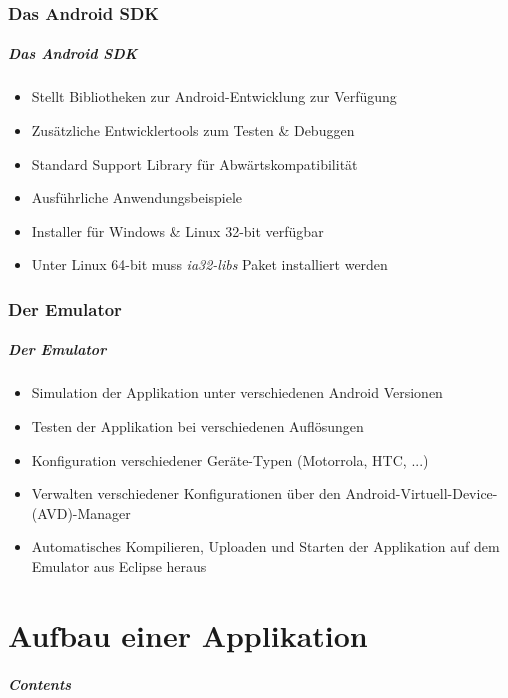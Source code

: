 \section{Das Android SDK}
\begin{frame}[label=eclipse_adt]
   \frametitle{Das Android SDK}
   \begin{itemize}
      \item Stellt Bibliotheken zur Android-Entwicklung zur Verfügung
      \item Zusätzliche Entwicklertools zum Testen \& Debuggen
      \item Standard Support Library für Abwärtskompatibilität
      \item Ausführliche Anwendungsbeispiele
      \item Installer für Windows \& Linux 32-bit verfügbar
      \item Unter Linux 64-bit muss \emph{ia32-libs} Paket installiert werden
   \end{itemize}
\end{frame}

\section{Der Emulator}
\begin{frame}[label=emulator]
   \frametitle{Der Emulator}
   \begin{itemize}
      \item Simulation der Applikation unter verschiedenen Android Versionen
      \item Testen der Applikation bei verschiedenen Auflösungen
      \item Konfiguration verschiedener Geräte-Typen (Motorrola, HTC, ...)
      \item Verwalten verschiedener Konfigurationen über den 
         Android-Virtuell-Device-(AVD)-Manager
      \item Automatisches Kompilieren, Uploaden und Starten der Applikation 
         auf dem Emulator aus Eclipse heraus
   \end{itemize}
\end{frame}

\part{Aufbau einer Applikation}
\frame{\partpage}
\begin{frame}
	\frametitle{Contents}
	\tableofcontents[]
\end{frame}

